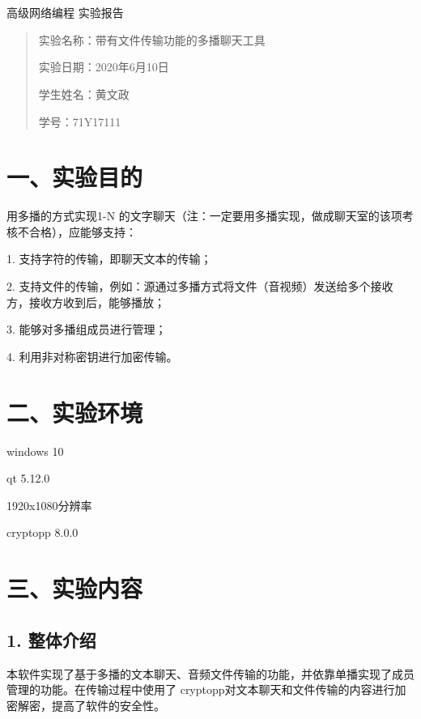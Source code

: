 \documentclass[UTF8]{ctexart}
\begin{document}
	\begin{center}
		\quad \\
		\quad \\
		\heiti \fontsize{45}{17} 高级网络编程
		\vskip 2.0cm
		\heiti \fontsize{39}{17} 实验报告	
	\end{center}
	\vskip 3.5cm
	\begin{quotation}
		\par\setlength\parindent{8.5em}
		\quad 
		\heiti 
		
		实验名称：带有文件传输功能的多播聊天工具
		
		实验日期：2020年6月10日
	
		学生姓名：黄文政
		
		学\hspace{0.72cm}号：71Y17111
		
		\vskip 2cm
		\centering
	\end{quotation}
	
\newpage
\songti \fontsize{13}{13}
\large
\section*{一、实验目的}

用多播的方式实现1-N 的文字聊天（注：一定要用多播实现，做成聊天室的该项考核不合格），应能够支持：

1. 支持字符的传输，即聊天文本的传输；

2. 支持文件的传输，例如：源通过多播方式将文件（音视频）发送给多个接收方，接收方收到后，能够播放；

3. 能够对多播组成员进行管理；

4. 利用非对称密钥进行加密传输。

\section*{二、实验环境}

windows 10

qt 5.12.0

1920x1080分辨率

cryptopp 8.0.0

\section*{三、实验内容}
\subsection*{\textbf{1. 整体介绍}}
本软件实现了基于多播的文本聊天、音频文件传输的功能，并依靠单播实现了成员管理的功能。在传输过程中使用了
cryptopp对文本聊天和文件传输的内容进行加密解密，提高了软件的安全性。
\end{document}
